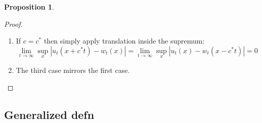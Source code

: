 \documentclass{article}
\theoremstyle{definition}
\newtheorem{proposition}[theorem]{Proposition}
\numberwithin{equation}{section}
\begin{document}
\begin{proposition}
\begin{proof}
\begin{enumerate}
For the second part, $\epsilon>0$. We need to find $t_0$ such that 
$$ \sup_{x \in K}|w_t(x-(c^*-c)t)-w_t(-\infty)| < \epsilon, \quad \forall t \geq t_0$$
Let $x_0$ be such that $|w_t(x)-w_t(-\infty)|<\epsilon$ for all $x \leq x_0$ and for all $t$. It suffices to choose $t_0$ such that
$$ x-(c^*-c)t \leq x_0, \quad \forall x \in K, \quad \forall t \geq t_0 $$
For this it suffices to have
$$ \sup K-(c^*-c)t \leq x_0, \quad \forall t \geq t_0 $$
Solving this inequality shows that it suffices to take any $\displaystyle t_0 \geq \frac{x_0-\sup K}{c^*-c}$.
\item If $c=c^*$ then simply apply translation inside the supremum:
$$ \lim_{t\to\infty} \sup_x |u_t(x+c^*t)-w_t(x)| = \lim_{t\to\infty} \sup_x |u_t(x)-w_t(x-c^*t)| = 0 $$
\item The third case mirrors the first case.
\end{enumerate}
\end{proof}
\end{proposition}

\subsection{Generalized defn}
\end{document}
